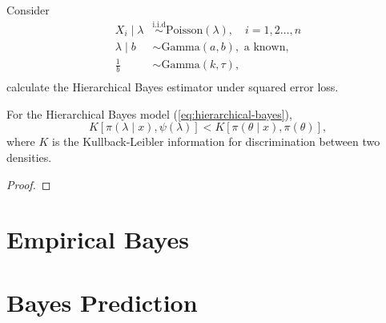 \begin{example}
    Consider
    \begin{equation}
        \begin{aligned}
            X_i\mid\lambda & \stackrel{\text{i.i.d}}{\sim} \text{Poisson}\left(\lambda\right),\quad i=1,2\ldots,n \\
            \lambda\mid b  & \sim \text{Gamma}\left(a,b\right), \text{ a known},                                  \\
            \frac{1}{b}    & \sim \text{Gamma}\left(k,\tau\right),                                                \\
        \end{aligned}
    \end{equation}
    calculate the Hierarchical Bayes estimator under squared error loss.
\end{example}


\begin{theorem}
    For the Hierarchical Bayes model (\ref{eq:hierarchical-bayes}),
    \begin{equation}
        K\left[\pi\left(\lambda\mid x\right),\psi\left(\lambda\right)\right] < K\left[\pi\left(\theta\mid x\right),\pi\left(\theta\right)\right],
    \end{equation}
    where $K$ is the Kullback-Leibler information for discrimination between two densities.
\end{theorem}

\begin{proof}

\end{proof}

\begin{note}

\end{note}

\section{Empirical Bayes}

\section{Bayes Prediction}